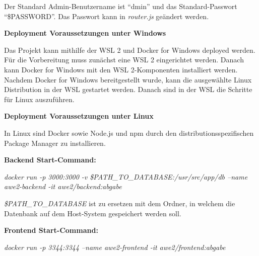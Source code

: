 Der Standard Admin-Benutzername ist \enquote{dmin} und das Standard-Passwort \enquote{\$PASSWORD}. Das Passwort kann in \textit{router.js} geändert werden.

\textbf{Deployment Voraussetzungen unter Windows}

Das Projekt kann mithilfe der WSL 2 und Docker for Windows deployed werden.
Für die Vorbereitung muss zunächst eine WSL 2 eingerichtet werden.
Danach kann Docker for Windows mit den WSL 2-Komponenten installiert werden.
Nachdem Docker for Windows bereitgestellt wurde, kann die ausgewählte Linux Distribution in der WSL gestartet werden.
Danach sind in der WSL die Schritte für Linux auszuführen.

\textbf{Deployment Voraussetzungen unter Linux}

In Linux sind Docker sowie Node.js und npm durch den distributionsspezifischen Package Manager zu installieren.

\textbf{Backend Start-Command:}

\textit{docker run -p 3000:3000 -v \$PATH\_TO\_DATABASE:/usr/src/app/db --name awe2-backend -it awe2/backend:abgabe}

\textit{\$PATH\_TO\_DATABASE} ist zu ersetzen mit dem Ordner, in welchem die Datenbank auf dem Host-System gespeichert werden soll.

\textbf{Frontend Start-Command:}

\textit{docker run -p 3344:3344 --name awe2-frontend -it awe2/frontend:abgabe}
